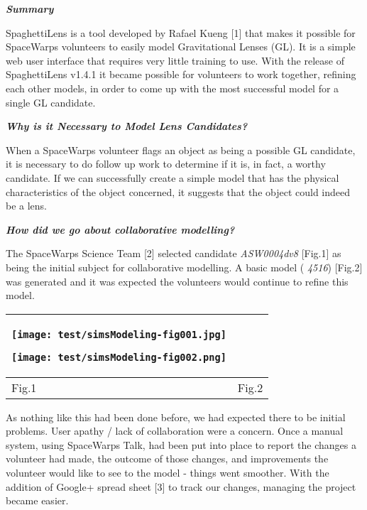 \documentclass{article}
\begin{document}
\baselineskip=13pt
\textbf{\emph{Summary}}

SpaghettiLens is a tool developed by Rafael Kueng {\small{}[1]} that makes it possible 
for SpaceWarps volunteers to easily model Gravitational Lenses (GL). It is a simple 
web user interface that requires very little training to use. With the release 
of SpaghettiLens v1.4.1 it became possible for volunteers to work together, refining 
each other models, in order to come up with the most successful model for a single 
GL candidate. 

\textbf{\emph{Why is it Necessary to Model Lens Candidates? }}

When a SpaceWarps volunteer flags an object as being a possible GL candidate, it 
is necessary to do follow up work to determine if it is, in fact, a worthy candidate. 
If we can successfully create a simple model that has the physical characteristics 
of the object concerned, it suggests that the object could indeed be a lens.

\textbf{\emph{How did we go about collaborative modelling?}}

The SpaceWarps Science Team {\small{}[2]} selected candidate {\color{color02} \emph{ASW0004dv8}} 
 [Fig.1] as being the initial subject for collaborative modelling. A basic model 
({\color{color02} \emph{4516}}) [Fig.2] was generated and it was expected the volunteers 
would continue to refine this model.

\begin{tabular}{|>{\raggedright}p{163pt}|>{\raggedright}p{162pt}|}
\hline

\texttt{[image: test/simsModeling-fig001.jpg]}

\texttt{[image: test/simsModeling-fig002.png]}
 & \tabularnewline
\hline
Fig.1  & Fig.2\tabularnewline
\hline
\end{tabular}

\vspace{13pt}
As nothing like this had been done before, we had expected there to be initial 
problems. User apathy / lack of collaboration were a concern. Once a manual system, 
using SpaceWarps Talk, had been put into place to report the changes a volunteer 
had made, the outcome of those changes, and improvements the volunteer would like 
to see to the model - things went smoother. With the addition of Google+ spread 
sheet {\small{}[3]} to track our changes, managing the project became easier.
\end{document}
